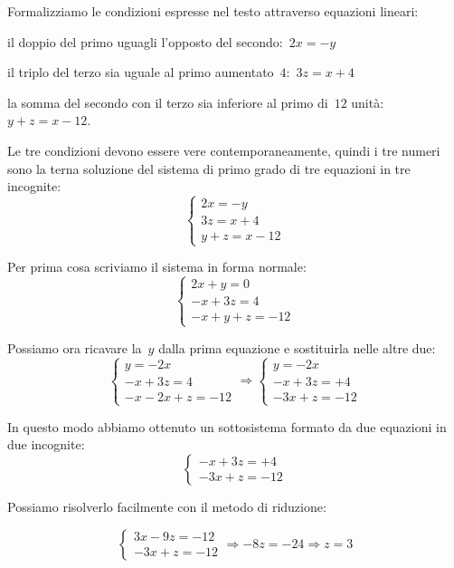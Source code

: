 \begin{soluzione}
Formalizziamo le condizioni espresse nel testo attraverso equazioni
lineari:


\begin{enumeratea}
\item il doppio del primo uguagli l'opposto del secondo:~$2x=-y$
\item il triplo del terzo sia uguale al primo aumentato~$4$:~$3z=x+4$
\item la somma del secondo con il terzo sia inferiore al primo di~$12$ 
unità:~$y+z=x-12$.
\end{enumeratea}

Le tre condizioni devono essere vere contemporaneamente, quindi i tre
numeri sono la terna soluzione del sistema di primo grado di tre equazioni in 
tre incognite:
\[\left\{\begin{array}{l}
  2x=-y\\
  3z=x+4\\
  y+z=x-12
\end{array}\right.\]

Per prima cosa scriviamo il sistema in forma normale:
\[\left\{\begin{array}{l}
  2x+y=0\\
  -x+3z=4\\
  -x+y+z=-12
\end{array}\right.\]

Possiamo ora ricavare la~$y$ dalla prima equazione e sostituirla nelle altre 
due:
\[\left\{\begin{array}{l}
  y=-2x\\
  -x+3z=4\\
  -x -2x+z=-12
\end{array}\right.
\Rightarrow
\left\{\begin{array}{l}
  y=-2x\\
  -x+3z=+4\\
  -3x+z=-12
\end{array}\right.\]

In questo modo abbiamo ottenuto un sottosistema formato da due equazioni in 
due incognite:
\[\left\{\begin{array}{l}
  -x+3z=+4\\
  -3x+z=-12
\end{array}\right.\]

Possiamo risolverlo facilmente con il metodo di riduzione:

\[\left\{\begin{array}{l}
  3x-9z=-12\\
  -3x+z=-12
\end{array}\right.
\Rightarrow -8z=-24 \Rightarrow z=3
\]


\end{soluzione}
